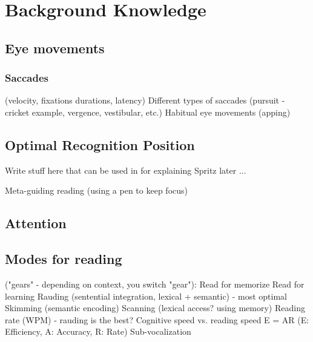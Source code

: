 \section{Background Knowledge}
\subsection{Eye movements}
\subsubsection{Saccades}
(velocity, fixations durations, latency)
Different types of saccades (pursuit - cricket example, vergence, vestibular, etc.)
Habitual eye movements (apping)
\subsection{Optimal Recognition Position} \label{ORP}
Write stuff here that can be used in for explaining Spritz later ...


Meta-guiding reading (using a pen to keep focus)
\subsection{Attention}
\subsection{Modes for reading}
("gears" - depending on context, you switch "gear"):
Read for memorize
Read for learning
Rauding (sentential integration, lexical + semantic) - most optimal
Skimming (semantic encoding)
Scanning (lexical access? using memory)
Reading rate (WPM) - rauding is the best?
Cognitive speed vs. reading speed
E = AR (E: Efficiency, A: Accuracy, R: Rate)
Sub-vocalization
